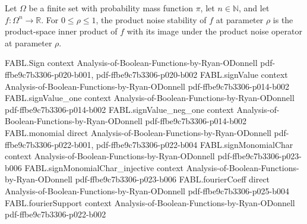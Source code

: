 \begin{definition}
\label{FABL.productNoiseStability}
\leanok
{}
Let $\Omega$ be a finite set with probability mass function $\pi$, let $n\in\mathbb{N}$,
and let $f\colon\Omega^n\to\mathbb{R}$. For $0\leq\rho\leq1$, the product noise
stability of $f$ at parameter $\rho$ is the product-space inner product of $f$ with its
image under the product noise operator at parameter $\rho$.
\end{definition}

\begin{theorem}
\label{FABL.FiniteFourierBasis.productNoiseStability_eq_sum}
\leanok
{}
\proofstep
  {FABL.Sign}
  {context}
  {Analysis-of-Boolean-Functions-by-Ryan-ODonnell}
  {pdf-ffbe9c7b3306-p020-b001,
    pdf-ffbe9c7b3306-p020-b002}
\proofstep
  {FABL.signValue}
  {context}
  {Analysis-of-Boolean-Functions-by-Ryan-ODonnell}
  {pdf-ffbe9c7b3306-p014-b002}
\proofstep
  {FABL.signValue_one}
  {context}
  {Analysis-of-Boolean-Functions-by-Ryan-ODonnell}
  {pdf-ffbe9c7b3306-p014-b002}
\proofstep
  {FABL.signValue_neg_one}
  {context}
  {Analysis-of-Boolean-Functions-by-Ryan-ODonnell}
  {pdf-ffbe9c7b3306-p014-b002}
\proofstep
  {FABL.monomial}
  {direct}
  {Analysis-of-Boolean-Functions-by-Ryan-ODonnell}
  {pdf-ffbe9c7b3306-p022-b001,
    pdf-ffbe9c7b3306-p022-b004}
\proofstep
  {FABL.signMonomialChar}
  {context}
  {Analysis-of-Boolean-Functions-by-Ryan-ODonnell}
  {pdf-ffbe9c7b3306-p023-b006}
\proofstep
  {FABL.signMonomialChar_injective}
  {context}
  {Analysis-of-Boolean-Functions-by-Ryan-ODonnell}
  {pdf-ffbe9c7b3306-p023-b006}
\proofstep
  {FABL.fourierCoeff}
  {direct}
  {Analysis-of-Boolean-Functions-by-Ryan-ODonnell}
  {pdf-ffbe9c7b3306-p025-b004}
\proofstep
  {FABL.fourierSupport}
  {context}
  {Analysis-of-Boolean-Functions-by-Ryan-ODonnell}
  {pdf-ffbe9c7b3306-p022-b002}

\end{theorem}
